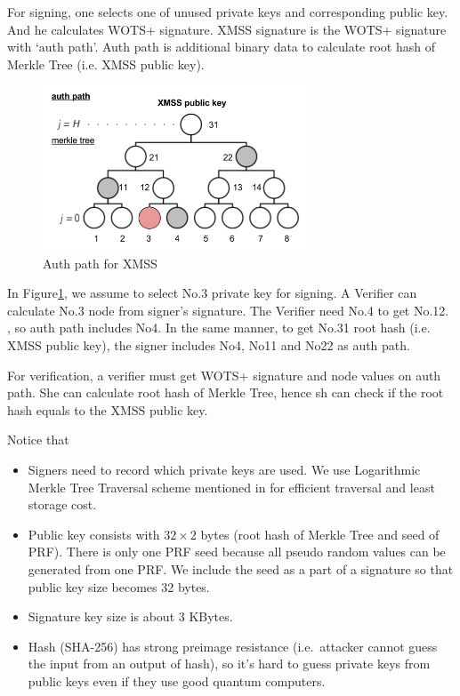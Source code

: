 \documentclass[a4paper,10pt,twocolumn]{article}
\begin{document}
For signing, one selects one of unused private keys and corresponding public key.
And he calculates WOTS+ signature. XMSS signature is the WOTS+ signature with `auth path'. Auth path is additional
binary data to calculate root hash of Merkle Tree (i.e. XMSS public key).

\begin{figure}[ht]
	\begin{center}
	\includegraphics[width=80mm]{auth_path.png}
	  \caption{Auth path for XMSS}
    \label{fig:xmss_auth}
	\end{center}
 \end{figure}

In Figure\ref{fig:xmss_auth}, we assume 
to select No.3 private key for signing. A Verifier can calculate No.3 node from signer's signature. The Verifier need No.4 to get No.12.
, so auth path includes No4. In the same manner, to get No.31 root hash (i.e. XMSS public key), the signer includes  No4, No11 and No22 as auth path.

For verification, a verifier must get WOTS+ signature and node values on auth path.
She can calculate root hash of Merkle Tree, hence sh can  check if
the root hash equals to the XMSS public key.

Notice that
\vspace{-0.5\baselineskip}
\begin{itemize}
	\setlength\itemsep{0em}
	\item Signers need to record which private keys are used. We use Logarithmic Merkle Tree Traversal scheme 
	mentioned in \cite{traverse} for efficient traversal and least storage cost.
	\item Public key consists with \(32 \times 2 \) bytes (root hash of Merkle Tree and seed of PRF).
	There is only one PRF seed because all pseudo random values can be generated from one PRF.
	We include the seed as a part of a signature so that public key size becomes 32 bytes.
	\item  Signature key size is about 3 KBytes.
	\item Hash (SHA-256) has strong preimage resistance (i.e.\ attacker cannot guess the input from an output of hash),
	 so it's hard to guess private keys from public keys even if they use good quantum computers.
\end{itemize}
		
\end{document}
